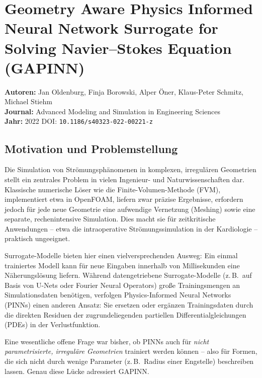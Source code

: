 \documentclass[a4paper,12pt]{article}
\begin{document}
\section*{Geometry Aware Physics Informed Neural Network Surrogate for Solving
Navier--Stokes Equation (GAPINN)}

\textbf{Autoren:} Jan Oldenburg, Finja Borowski, Alper \"Oner, Klaus-Peter Schmitz,
Michael Stiehm \\
\textbf{Journal:} Advanced Modeling and Simulation in Engineering Sciences \\
\textbf{Jahr:} 2022 \quad DOI: \texttt{10.1186/s40323-022-00221-z}

\subsection*{Motivation und Problemstellung}

Die Simulation von Str\"omungsph\"anomenen in komplexen, irregul\"aren Geometrien
stellt ein zentrales Problem in vielen Ingenieur- und Naturwissenschaften dar.
Klassische numerische L\"oser wie die Finite-Volumen-Methode (FVM), implementiert
etwa in OpenFOAM, liefern zwar pr\"azise Ergebnisse, erfordern jedoch f\"ur jede
neue Geometrie eine aufwendige Vernetzung (Meshing) sowie eine separate,
rechenintensive Simulation. Dies macht sie f\"ur zeitkritische Anwendungen --
etwa die intraoperative Str\"omungssimulation in der Kardiologie -- praktisch
ungeeignet.

Surrogate-Modelle bieten hier einen vielversprechenden Ausweg: Ein einmal
trainiertes Modell kann f\"ur neue Eingaben innerhalb von Millisekunden eine
N\"aherungsl\"osung liefern. W\"ahrend datengetriebene Surrogate-Modelle
(z.\,B.\ auf Basis von U-Nets oder Fourier Neural Operators) gro\ss{}e
Trainingsmengen an Simulationsdaten ben\"otigen, verfolgen Physics-Informed
Neural Networks (PINNs) einen anderen Ansatz: Sie ersetzen oder erg\"anzen
Trainingsdaten durch die direkten Residuen der zugrundeliegenden
partiellen Differentialgleichungen (PDEs) in der Verlustfunktion.

Eine wesentliche offene Frage war bisher, ob PINNs auch f\"ur \emph{nicht
parametrisierte, irregul\"are Geometrien} trainiert werden k\"onnen -- also
f\"ur Formen, die sich nicht durch wenige Parameter (z.\,B.\ Radius einer
Engstelle) beschreiben lassen. Genau diese L\"ucke adressiert GAPINN.

\end{document}
